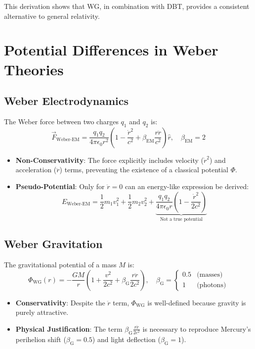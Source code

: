 This derivation shows that WG, in combination with DBT, provides a consistent alternative to general relativity.

\section{Potential Differences in Weber Theories}
\label{sec:weber_potentials}

\subsection{Weber Electrodynamics}
The Weber force between two charges $q_1$ and $q_2$ is:
\[
\vec{F}_{\text{Weber-EM}} = \frac{q_1 q_2}{4\pi\epsilon_0 r^2} \left(1 - \frac{\dot{r}^2}{c^2} + \beta_{\text{EM}} \frac{r\ddot{r}}{c^2}\right)\hat{r}, \quad \beta_{\text{EM}} = 2
\]
\begin{itemize}
\item \textbf{Non-Conservativity}: The force explicitly includes velocity ($\dot{r}^2$) and acceleration ($\ddot{r}$) terms, preventing the existence of a classical potential $\Phi$.
\item \textbf{Pseudo-Potential}: Only for $\ddot{r} = 0$ can an energy-like expression be derived:
\[
E_{\text{Weber-EM}} = \frac{1}{2}m_1v_1^2 + \frac{1}{2}m_2v_2^2 + \underbrace{\frac{q_1 q_2}{4\pi\epsilon_0 r}\left(1 - \frac{\dot{r}^2}{2c^2}\right)}_{\text{Not a true potential}}
\]
\end{itemize}

\subsection{Weber Gravitation}
The gravitational potential of a mass $M$ is:
\[
\Phi_{\text{WG}}(r) = -\frac{GM}{r}\left(1 + \frac{v^2}{2c^2} + \beta_{\text{G}} \frac{r\ddot{r}}{2c^2}\right), \quad \beta_{\text{G}} = 
\begin{cases}
0.5 & \text{(masses)} \\
1 & \text{(photons)}
\end{cases}
\]
\begin{itemize}
\item \textbf{Conservativity}: Despite the $\ddot{r}$ term, $\Phi_{\text{WG}}$ is well-defined because gravity is purely attractive.
\item \textbf{Physical Justification}: The term $\beta_{\text{G}}\frac{r\ddot{r}}{2c^2}$ is necessary to reproduce Mercury's perihelion shift ($\beta_{\text{G}} = 0.5$) and light deflection ($\beta_{\text{G}} = 1$).
\end{itemize}

